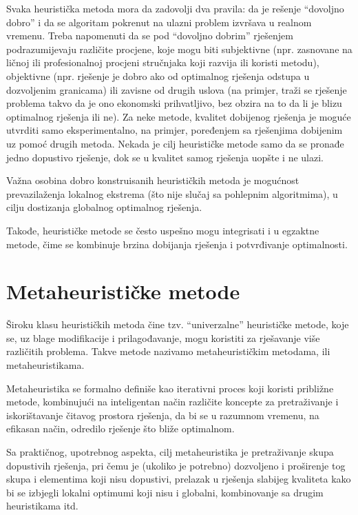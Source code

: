 \documentclass[a4paper, utf8, 11pt, colorlinks]{book}
\begin{document}
 
 Svaka heuristička metoda mora da zadovolji dva pravila: da je rešenje ``dovoljno
 dobro'' i da se algoritam pokrenut na ulazni problem izvršava u realnom vremenu. Treba napomenuti da se pod  ``dovoljno
 dobrim'' rješenjem podrazumijevaju različite procjene, koje mogu biti subjektivne (npr. zasnovane na ličnoj ili profesionalnoj procjeni stručnjaka koji razvija ili koristi metodu), objektivne (npr.  rješenje je dobro ako od optimalnog rješenja odstupa u dozvoljenim granicama) ili zavisne od drugih uslova (na primjer, traži se rješenje problema takvo da je ono ekonomski prihvatljivo, bez obzira na to da li je blizu optimalnog rješenja ili ne). 
 Za neke metode, kvalitet dobijenog rješenja je moguće utvrditi samo eksperimentalno, na primjer, poređenjem sa rješenjima dobijenim uz pomoć drugih metoda. Nekada je cilj heurističke metode samo da se pronađe jedno dopustivo rješenje, dok se u kvalitet samog rješenja uopšte i ne ulazi.
 
 Važna osobina dobro konstruisanih heurističkih metoda je mogućnost prevazilaženja lokalnog ekstrema (što nije slučaj sa pohlepnim algoritmima), u cilju dostizanja globalnog optimalnog rješenja. 
 
 Takođe, heurističke metode se često uspešno mogu integrisati i u egzaktne metode, čime se kombinuje brzina dobijanja rješenja i potvrđivanje optimalnosti.
 
 \section{Metaheurističke metode}
 
 Široku klasu heurističkih metoda čine tzv. ``univerzalne'' heurističke metode, koje se, uz blage modifikacije i prilagođavanje, mogu koristiti za rješavanje više različitih problema. Takve metode nazivamo metaheurističkim metodama, ili metaheuristikama.  
 
 Metaheuristika se formalno definiše kao iterativni proces koji koristi približne metode, kombinujući na inteligentan način različite koncepte za pretraživanje i iskorištavanje čitavog prostora rješenja, da bi se u razumnom vremenu, na efikasan način, odredilo rješenje što bliže optimalnom.
 
 Sa praktičnog, upotrebnog aspekta, cilj metaheuristika je pretraživanje skupa dopustivih rješenja, pri čemu je (ukoliko je potrebno) dozvoljeno i proširenje tog skupa i elementima koji nisu dopustivi, prelazak u rješenja slabijeg kvali\-teta kako bi se izbjegli lokalni optimumi koji nisu i globalni, kombinovanje sa drugim heuristikama itd.
 
\end{document}

